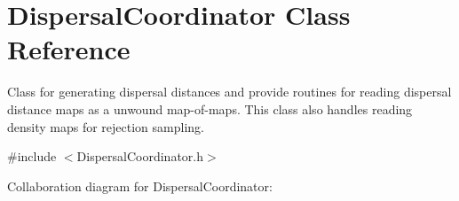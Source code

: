 \hypertarget{class_dispersal_coordinator}{}\section{Dispersal\+Coordinator Class Reference}
\label{class_dispersal_coordinator}


Class for generating dispersal distances and provide routines for reading dispersal distance maps as a unwound map-\/of-\/maps. This class also handles reading density maps for rejection sampling.  




{\ttfamily \#include $<$Dispersal\+Coordinator.\+h$>$}



Collaboration diagram for Dispersal\+Coordinator\+:
